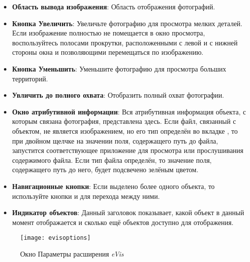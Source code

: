\begin{itemize}[label=--]
\item \textbf{Область вывода изображения}: Область отображения фотографий.
\item \textbf{Кнопка Увеличить}: Увеличьте фотографию для просмотра мелких
деталей. Если изображение полностью не помещается в окно просмотра,
воспользуйтесь полосами прокрутки, расположенными с левой и с нижней
стороны окна и позволяющими перемещаться по изображению.
\item \textbf{Кнопка Уменьшить}: Уменьшите фотографию для просмотра больших
территорий.
\item \textbf{Увличить до полного охвата}: Отобразить полный охват
фотографии.
\item \textbf{Окно атрибутивной информации}: Вся атрибутивная информация
объекта, с которым связана фотография, представлена здесь. Если
файл, связанный с объектом, не является изображением, но его тип определён во
вкладке , то при двойном щелчке на значении поля,
содержащего путь до файла, запустится соответствующее приложение
для просмотра или прослушивания содержимого файла. Если тип файла определён,
то значение поля, содержащего путь до него, будет подсвечено зелёным цветом.
\item \textbf{Навигационные кнопки}: Если выделено более одного
объекта, то используйте кнопки  и 
для перехода между ними.
\item \textbf{Индикатор объектов}: Данный заголовок показывает, какой объект
в данный момент отображается и сколько ещё объектов доступно для отображения.
\end{itemize}

\label{evis_options_window}

\begin{figure}[ht]
   \centering
   \texttt{[image: evisoptions]}
   \caption{\label{evisoptions}Окно Параметры расширения \emph{eVis} \wincaption}
\end{figure}

